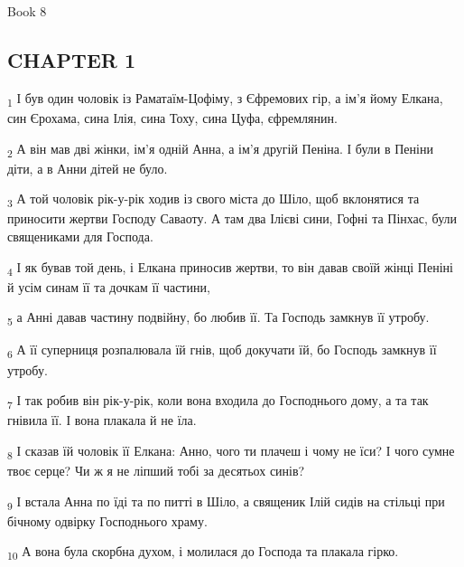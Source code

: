 Book 8
\subsection{CHAPTER 1}
\begin{tcolorbox}
\textsubscript{1} І був один чоловік із Раматаїм-Цофіму, з Єфремових гір, а ім'я йому Елкана, син Єрохама, сина Ілія, сина Тоху, сина Цуфа, єфремлянин.
\end{tcolorbox}
\begin{tcolorbox}
\textsubscript{2} А він мав дві жінки, ім'я одній Анна, а ім'я другій Пеніна. І були в Пеніни діти, а в Анни дітей не було.
\end{tcolorbox}
\begin{tcolorbox}
\textsubscript{3} А той чоловік рік-у-рік ходив із свого міста до Шіло, щоб вклонятися та приносити жертви Господу Саваоту. А там два Ілієві сини, Гофні та Пінхас, були священиками для Господа.
\end{tcolorbox}
\begin{tcolorbox}
\textsubscript{4} І як бував той день, і Елкана приносив жертви, то він давав своїй жінці Пеніні й усім синам її та дочкам її частини,
\end{tcolorbox}
\begin{tcolorbox}
\textsubscript{5} а Анні давав частину подвійну, бо любив її. Та Господь замкнув її утробу.
\end{tcolorbox}
\begin{tcolorbox}
\textsubscript{6} А її суперниця розпалювала їй гнів, щоб докучати їй, бо Господь замкнув її утробу.
\end{tcolorbox}
\begin{tcolorbox}
\textsubscript{7} І так робив він рік-у-рік, коли вона входила до Господнього дому, а та так гнівила її. І вона плакала й не їла.
\end{tcolorbox}
\begin{tcolorbox}
\textsubscript{8} І сказав їй чоловік її Елкана: Анно, чого ти плачеш і чому не їси? І чого сумне твоє серце? Чи ж я не ліпший тобі за десятьох синів?
\end{tcolorbox}
\begin{tcolorbox}
\textsubscript{9} І встала Анна по їді та по питті в Шіло, а священик Ілій сидів на стільці при бічному одвірку Господнього храму.
\end{tcolorbox}
\begin{tcolorbox}
\textsubscript{10} А вона була скорбна духом, і молилася до Господа та плакала гірко.
\end{tcolorbox}
